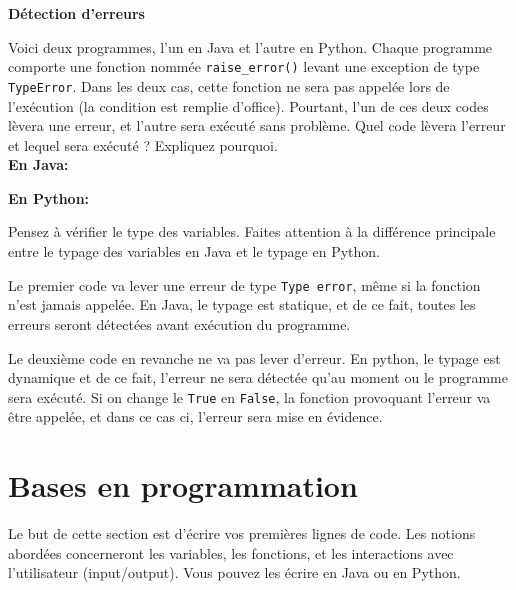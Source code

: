 \begin{Exercice}[5 minutes] \textbf{Détection d'erreurs}

    Voici deux programmes, l’un en Java et l’autre en Python. Chaque programme comporte une fonction nommée \lstinline{raise_error()} levant une exception de type \lstinline{TypeError}. Dans les deux cas, cette fonction ne sera pas appelée lors de l'exécution (la condition est remplie d’office). Pourtant, l’un de ces deux codes lèvera une erreur, et l’autre sera exécuté sans problème. Quel code lèvera l’erreur et lequel sera exécuté ? Expliquez pourquoi.\\
    \newpage
    \textbf{En Java:}
    
    
    
    \textbf{En Python:}
      
    
    
    \begin{conseil}
        Pensez à vérifier le type des variables. Faites attention à la différence principale entre le typage des variables en Java et le typage en Python.\\
    \end{conseil}
    \begin{solution}
    	Le premier code va lever une erreur de type \lstinline{Type error}, même si la fonction n'est jamais appelée. En Java, le typage est statique, et de ce fait, toutes les erreurs seront détectées avant exécution du programme.

Le deuxième code en revanche ne va pas lever d'erreur. En python, le typage est dynamique et de ce fait, l'erreur ne sera détectée qu'au moment ou le programme sera exécuté. Si on change le \lstinline{True} en \lstinline{False}, la fonction provoquant l'erreur va être appelée, et dans ce cas ci, l'erreur sera mise en évidence.\\
    \end{solution}

\end{Exercice}
\newpage

\section{Bases en programmation}
Le but de cette section est d'écrire vos premières lignes de code. Les notions abordées concerneront les variables, les fonctions, et les interactions avec l'utilisateur (input/output). Vous pouvez les écrire en Java ou en Python.\\

